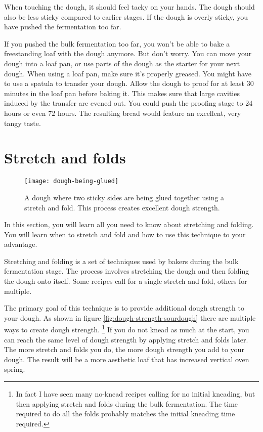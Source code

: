 When touching the dough, it should feel tacky
on your hands. The dough should also be less sticky
compared to earlier stages. If the dough is overly
sticky, you have pushed the fermentation too far.

If you pushed the bulk fermentation too far, you won't be able
to bake a freestanding loaf with the dough anymore. But don't
worry. You can move your dough into a loaf pan, or use parts
of the dough as the starter for your next dough. When using
a loaf pan, make sure it's properly greased. You might have
to use a spatula to transfer your dough. Allow the dough
to proof for at least 30 minutes in the loaf pan before
baking it. This makes sure that large cavities induced
by the transfer are evened out. You could push the proofing
stage to 24 hours or even 72 hours. The resulting
bread would feature an excellent, very tangy taste.


\section{Stretch and folds}

\begin{figure}[!htb]
  \texttt{[image: dough-being-glued]}
  \caption{A dough where two sticky sides are being glued together using
  a stretch and fold. This process creates excellent dough strength.}
\end{figure}

In this section, you will learn all you need to know about stretching and
folding. You will learn when to stretch and fold and how to use this technique
to your advantage.

Stretching and folding is a set of techniques used by bakers during the bulk
fermentation stage. The process involves stretching the dough and then
folding the dough onto itself. Some recipes call for a single stretch
and fold, others for multiple.

The primary goal of this technique is to provide
additional dough strength to your dough. As shown in figure \ref{fig:dough-strength-sourdough}
there are multiple ways to create dough strength. \footnote{In fact I have seen many no-knead
recipes calling for no initial kneading, but then applying stretch and folds
during the bulk fermentation. The time required to do all the folds probably
matches the initial kneading time required.} If you do not knead as much at
the start, you can reach the same level of dough strength by applying stretch
and folds later. The more stretch and folds you do, the more dough strength
you add to your dough. The result will be a more aesthetic loaf that has
increased vertical oven spring.

